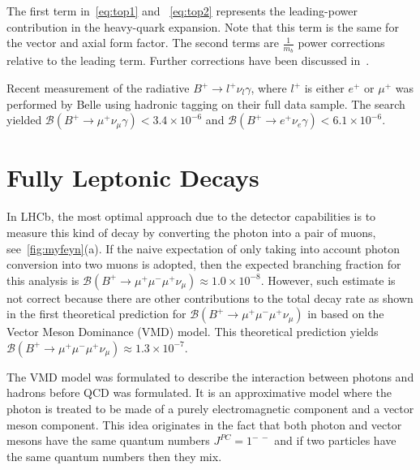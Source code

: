 The first term in~\autoref{eq:top1} and ~\autoref{eq:top2} represents the leading-power contribution in the heavy-quark expansion. Note that this term
is the same for the vector and axial form factor. The second terms are $\frac{1}{m_{b}}$ power corrections relative to the leading term. Further corrections have been discussed in~\cite{Wang:2016beq}.



Recent measurement of the radiative $B^{+} \rightarrow l^{+} \nu_{l} \gamma$, where $l^{+}$ is either $e^{+}$ or $\mu^{+}$ was performed by Belle using hadronic tagging on their full data sample\cite{Heller:2015vvm}. The search yielded $\mathcal{B}(B^{+}\rightarrow \mu^{+} \nu_\mu \gamma) < 3.4\times 10^{-6}$ and $\mathcal{B}(B^{+}\rightarrow e^{+} \nu_e \gamma) < 6.1\times 10^{-6}$.



\section{Fully Leptonic  Decays}
\label{mydecay}

In LHCb, the most optimal approach due to the detector capabilities is to measure this kind of decay by converting the photon into a pair of muons, see~\autoref{fig:myfeyn}(a). If the naive expectation of only taking into account photon conversion into two muons is adopted, then the expected branching fraction for this analysis is $\mathcal{B}(B^{+}\rightarrow \mu^{+} \mu^{-} \mu^{+} \nu_{\mu}) \approx 1.0\times 10^{-8}$. However, such estimate is not correct because there are other contributions to the total decay rate as shown in the first theoretical prediction for $\mathcal{B}(B^{+}\rightarrow \mu^{+} \mu^{-} \mu^{+} \nu_{\mu})$ in \cite{Danilina:2018uzr} based on the Vector Meson Dominance (VMD) model. This theoretical prediction yields $\mathcal{B}(B^{+} \rightarrow \mu^{+} \mu^{-} \mu^{+} \nu_{\mu}) \approx 1.3\times 10^{-7}$.%

 The VMD model was formulated to describe the interaction between photons and hadrons before \gls{QCD} was formulated. It is an approximative model where the photon is treated to be made of a purely electromagnetic component and a vector meson component. This idea originates in the fact that both photon and vector mesons have the same quantum numbers $J^{PC} = 1^{-\ -}$ and if two particles have the same quantum numbers then they mix. %

